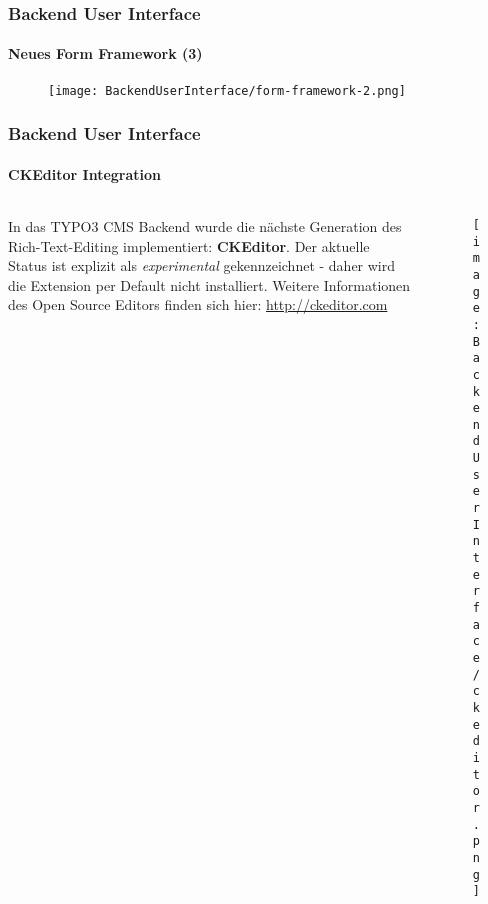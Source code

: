 \begin{frame}[fragile]
	\frametitle{Backend User Interface}
	\framesubtitle{Neues Form Framework (3)}

	\begin{figure}
		\texttt{[image: BackendUserInterface/form-framework-2.png]}
	\end{figure}

\end{frame}


\begin{frame}[fragile]
	\frametitle{Backend User Interface}
	\framesubtitle{CKEditor Integration}

	\begin{columns}[T]
		\begin{column}{.5\textwidth}
			In das TYPO3 CMS Backend wurde die nächste Generation des Rich-Text-Editing implementiert:
			\textbf{CKEditor}.\newline
			Der aktuelle Status ist explizit als \textit{experimental} gekennzeichnet - daher wird
			die Extension per Default nicht installiert.\newline
			Weitere Informationen des Open Source Editors finden sich hier: \url{http://ckeditor.com}
		\end{column}
		\begin{column}{.5\textwidth}
			\begin{figure}\vspace*{-0.4cm}
				\texttt{[image: BackendUserInterface/ckeditor.png]}
			\end{figure}
		\end{column}
	\end{columns}

\end{frame}




